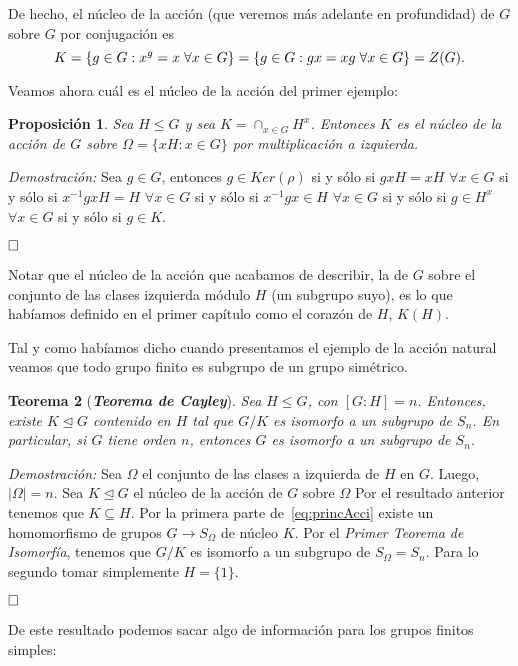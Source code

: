 \documentclass[12pt]{article}
\newtheorem{theorem}{Teorema}[section]
\newtheorem{proposition}[theorem]{Proposición}
\begin{document}
De hecho, el núcleo de la acción (que veremos más adelante en profundidad) de $G$ sobre $G$ por conjugación es $$K = \lbrace g \in G : x^g =x \hspace{0.1cm} \forall x \in G \rbrace = \lbrace g \in G:gx=xg \hspace{0.1cm} \forall x \in G \rbrace = Z(G).$$

Veamos ahora cuál es el núcleo de la acción del primer ejemplo:

\begin{proposition}Sea $H \leq G$ y sea $K = \cap_{x \in G} H^x$. Entonces $K$ es el núcleo de la acción de $G$ sobre $\Omega = \lbrace xH :x \in G \rbrace$ por multiplicación a izquierda.
\end{proposition}
\emph{Demostración: }Sea $g \in G$, entonces $g \in Ker (\rho)$ si y sólo si $gxH = xH$ $\forall x \in G$ si y sólo si $x^{-1}gx H = H$  $\forall x \in G$ si y sólo si $x^{-1}gx \in H$ $\forall x \in G$ si y sólo si $g \in H^x$ $\forall x \in G$ si y sólo si $g \in K$.

$\hfill \square$

Notar que el núcleo de la acción que acabamos de describir, la de $G$ sobre el conjunto de las clases izquierda módulo $H$ (un subgrupo suyo), es lo que habíamos definido en el primer capítulo como el corazón de $H$, $K(H)$.

Tal y como habíamos dicho cuando presentamos el ejemplo de la acción natural veamos que todo grupo finito es subgrupo de un grupo simétrico.

\begin{theorem}[\textbf{\textit{Teorema de Cayley}}]
Sea $H \leq G$, con $[G:H] = n$. Entonces, existe $K \unlhd G$ contenido en $H$ tal que $G/K$ es isomorfo a un subgrupo de $S_n$. En particular, si $G$ tiene orden $n$, entonces $G$ es isomorfo a un subgrupo de $S_n$.
\end{theorem}
\emph{Demostración: }Sea $\Omega$ el conjunto de las clases a izquierda de $H$ en $G$. Luego, $|\Omega | = n$. Sea $K \unlhd G$ el núcleo de la acción de $G$ sobre $\Omega$ Por el resultado anterior tenemos que $K \subseteq H$. Por la primera parte de~\ref{eq:princAcci} existe un homomorfismo de grupos $G \longrightarrow S_{\Omega}$ de núcleo $K$. Por el \textit{Primer Teorema de Isomorfía}, tenemos que $G/K$ es isomorfo a un subgrupo de $S_{\Omega} = S_n$. Para lo segundo tomar simplemente $H = \lbrace 1 \rbrace$.

$\hfill \square$

De este resultado podemos sacar algo de información para los grupos finitos simples:
\end{document}

